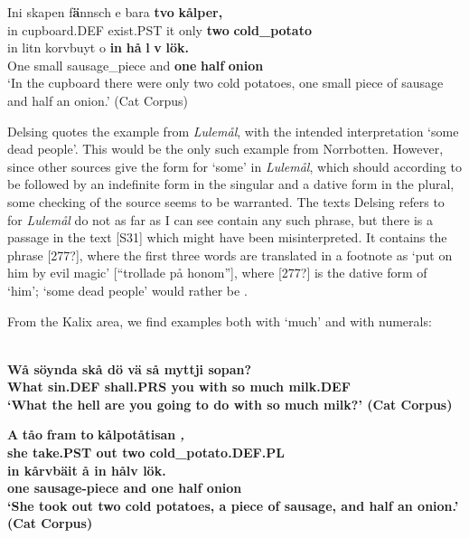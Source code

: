 \z

\ea
\gll Ini  skapen  f\textbf{ä}nnsch  e  bara  \textbf{tvo} \textbf{  kålper,}\\
in  cupboard.DEF  exist.PST  it  only  \textbf{two} \textbf{cold\_potato}\\
\gll in  litn  korvbuyt  o  \textbf{in} \textbf{  hå} \textbf{l} \textbf{v} \textbf{  lök.}\\
One  small  sausage\_piece  and  \textbf{one} \textbf{half} \textbf{onion}\\
\glt ‘In the cupboard there were only two cold potatoes, one small piece of sausage and half an onion.’ (Cat Corpus)

\z

Delsing quotes the example from \textit{Lulemål}, with the intended interpretation ‘some dead people’. This would be the only such example from Norrbotten. However, since other sources give the form  for ‘some’ in \textit{Lulemål}, which should according to \citet{Nordström1925} be followed by an indefinite form in the singular and a dative form in the plural, some checking of the source seems to be warranted. The texts Delsing refers to for \textit{Lulemål} do not as far as I can see contain any such phrase, but there is a passage in the text [S31] which might have been misinterpreted. It contains the phrase [277?], where the first three words are translated in a footnote as ‘put on him by evil magic’ [“trollade på honom”], where [277?] is the dative form of ‘him’; ‘some dead people’ would rather be . 

From the Kalix area, we find examples both with ‘much’ and with numerals:

\ea\label{}
\\
\gll \bfseries Wå  söynda  skå  dö  vä  så  myttji  sopan?\\
\bfseries What  sin.DEF  shall.PRS  you  with  so  much  milk.DEF\\
\glt ‘What the hell are you going to do with so \textbf{much milk}?’ (Cat Corpus)

\z

\ea
\gll \textbf{A} \textbf{tåo} \textbf{fram} \textbf{to} \textbf{\textit{  }} \textbf{kålpotåtisan} \textbf{\textit{,}}\\
\bfseries
she  take.PST  out  two  cold\_potato.DEF.PL\\
\gll in  kårvbäit  å  in  hålv  lök.\\
one  sausage-piece  and  one  half  onion\\
\glt ‘She took out two cold potatoes, a piece of sausage, and half an onion.’ (Cat Corpus)

